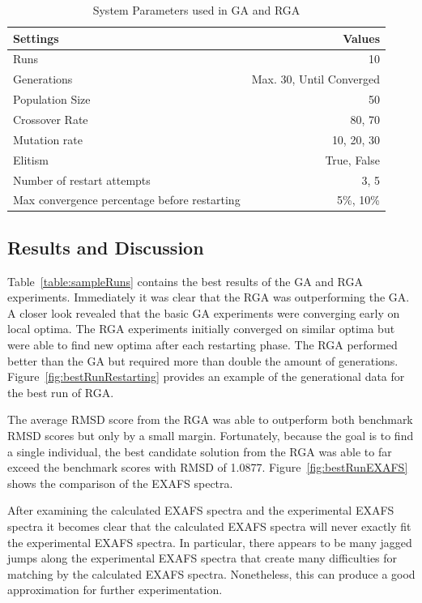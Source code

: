 \documentclass[conference]{IEEEtran}
\begin{document}
\begin{table}
\caption{System Parameters used in GA and RGA}
\label{table:gaParameters}
\centering
\begin{tabular}{ | l | r | }
  \hline
    Settings & Values \\ \hline \hline
    Runs & 10 \\ \hline
    Generations & Max. 30, Until Converged \\ \hline
    Population Size & 50 \\ \hline
    Crossover Rate & 80, 70 \\ \hline
    Mutation rate & 10, 20, 30 \\ \hline
    Elitism & True, False \\ \hline
    Number of restart attempts & 3, 5 \\ \hline
    Max convergence percentage before restarting & 5\%, 10\% \\ \hline
\end{tabular}
\end{table}

\subsection{Results and Discussion}

Table~\ref{table:sampleRuns} contains the best results of the GA and RGA experiments. Immediately it was clear that the RGA was outperforming the GA. A closer look revealed that the basic GA experiments were converging early on local optima. The RGA experiments initially converged on similar optima but were able to find new optima after each restarting phase. The RGA performed better than the GA but required more than double the amount of generations. Figure~\ref{fig:bestRunRestarting} provides an example of the generational data for the best run of RGA.

The average RMSD score from the RGA was able to outperform both benchmark RMSD scores but only by a small margin. Fortunately, because the goal is to find a single individual, the best candidate solution from the RGA was able to far exceed the benchmark scores with RMSD of 1.0877. Figure~\ref{fig:bestRunEXAFS} shows the comparison of the EXAFS spectra.

After examining the calculated EXAFS spectra and the experimental EXAFS spectra it becomes clear that the calculated EXAFS spectra will never exactly fit the experimental EXAFS spectra. In particular, there appears to be many jagged jumps along the experimental EXAFS spectra that create many difficulties for matching by the calculated EXAFS spectra. Nonetheless, this can produce a good approximation for further experimentation.
\end{document}
